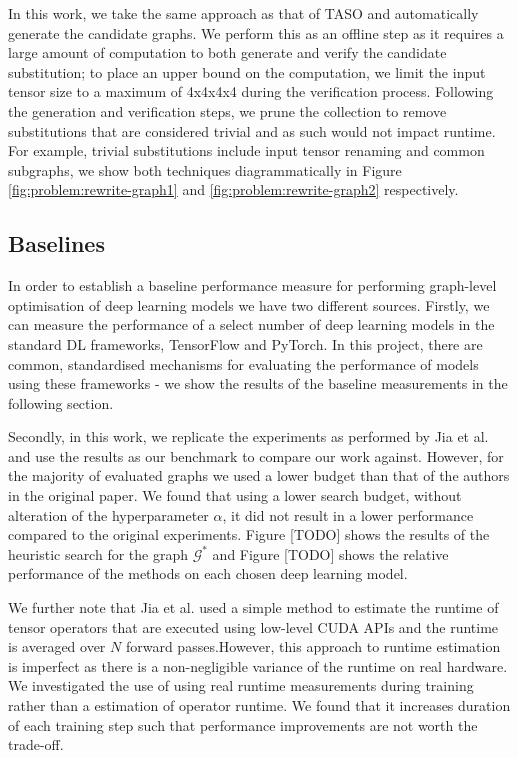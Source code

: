 In this work, we take the same approach as that of TASO and automatically generate the candidate graphs. We perform this as an offline step as it requires a large amount of computation to both generate and verify the candidate substitution; to place an upper bound on the computation, we limit the input tensor size to a maximum of 4x4x4x4 during the verification process. Following the generation and verification steps, we prune the collection to remove substitutions that are considered trivial and as such would not impact runtime. For example, trivial substitutions include input tensor renaming and common subgraphs, we show both techniques diagrammatically in Figure \ref{fig:problem:rewrite-graph1} and \ref{fig:problem:rewrite-graph2} respectively.



\subsection{Baselines}
In order to establish a baseline performance measure for performing graph-level optimisation of deep learning models we have two different sources. Firstly, we can measure the performance of a select number of deep learning models in the standard DL frameworks, TensorFlow and PyTorch. In this project, there are common, standardised mechanisms for evaluating the performance of models using these frameworks - we show the results of the baseline measurements in the following section.

Secondly, in this work, we replicate the experiments as performed by Jia et al. \cite{jia2019taso} and use the results as our benchmark to compare our work against. However, for the majority of evaluated graphs we used a lower budget than that of the authors in the original paper. We found that using a lower search budget, without alteration of the hyperparameter $\alpha$, it did not result in a lower performance compared to the original experiments. Figure [TODO] shows the results of the heuristic search for the graph $\mathcal{G}^*$ and Figure [TODO] shows the relative performance of the methods on each chosen deep learning model. 

We further note that Jia et al. \cite{jia2019taso} used a simple method to estimate the runtime of tensor operators that are executed using low-level CUDA APIs and the runtime is averaged over $N$ forward passes.However, this approach to runtime estimation is imperfect as there is a non-negligible variance of the runtime on real hardware. We investigated the use of using real runtime measurements during training rather than a estimation of operator runtime. We found that it increases duration of each training step such that performance improvements are not worth the trade-off.

